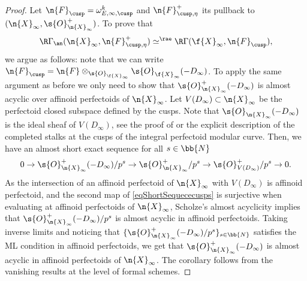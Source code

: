 \begin{proof}
Let $\n{F}_{\cusp}=\omega_{E,\infty,\cusp}^{k}$ and $\n{F}^+_{\cusp, \eta}$ its pullback to $(\n{X}_{\infty}, \s{O}^+_{\n{X}_{\infty}})$. To prove that
\[
\R\Gamma_{\an}(\n{X}_{\infty}, \n{F}^+_{\cusp,\eta}) \simeq^{\rae} \R\Gamma(\f{X}_{\infty}, \n{F}_{\cusp}),
\]
we argue as follows: note that we can write $\n{F}_{\cusp}= \n{F}\otimes_{\s{O}_{\f{X}_{\infty}}} \s{O}_{\f{X}_{\infty}}(-D_{\infty})$. To apply the same argument as before we only need to show that $\s{O}_{\n{X}_{\infty}}^+(-D_{\infty})$ is almost acyclic over affinoid perfectoids of $\n{X}_{\infty}$. Let $V(D_{\infty})\subset \n{X}_{\infty}$ be the perfectoid closed subspace defined by the cusps. Note that $\s{O}_{\n{X}_{\infty}}(-D_\infty)$ is the ideal sheaf of $V(D_{\infty})$, see the proof of \cite[Th.\,IV.2.1]{scholzeTorsCoho2015} or the explicit description of the completed stalks at the cusps of the integral perfectoid modular curve. Then, we have an almost short exact sequence for all $s\in \bb{N}$
\begin{equation}
\label{eqShortSequececusps}
0\to \s{O}^+_{\n{X}_{\infty}}(-D_{\infty})/p^s \to \s{O}^+_{\n{X}_{\infty}}/p^s \to \s{O}^+_{V(D_{\infty})}/p^s \to 0.
\end{equation}
As the intersection of an affinoid perfectoid of $\n{X}_{\infty}$ with $V(D_{\infty})$ is affinoid perfectoid, and the second map of \eqref{eqShortSequececusps} is surjective when evaluating at affinoid perfectoids of $\n{X}_{\infty}$, Scholze's almost acyclicity implies that $\s{O}^+_{\n{X}_{\infty}}(-D_{\infty})/p^s$ is almost acyclic in affinoid perfectoids. Taking inverse limits and noticing that $\{\s{O}^+_{\n{X}_{\infty}}(-D_{\infty})/p^s \}_{s\in \bb{N}}$ satisfies the ML condition in affinoid perfectoids, we get that $\s{O}^+_{\n{X}_{\infty}}(-D_{\infty})$ is almost acyclic in affinoid perfectoids of $\n{X}_{\infty}$. The corollary follows from the vanishing results at the level of formal schemes.
\end{proof}

